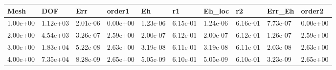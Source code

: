 \begin{tabular}{llllllllll}
Mesh & DOF & Err & order1 & Eh & r1 & Eh_loc & r2 & Err_Eh & order2 \\ 
\hline 
1.00e+00 & 1.12e+03 & 2.01e-06 & 0.00e+00 & 1.23e-06 & 6.15e-01 & 1.24e-06 & 6.16e-01 & 7.73e-07 & 0.00e+00 \\ 
2.00e+00 & 4.54e+03 & 3.26e-07 & 2.59e+00 & 2.00e-07 & 6.12e-01 & 2.00e-07 & 6.12e-01 & 1.26e-07 & 2.59e+00 \\ 
3.00e+00 & 1.83e+04 & 5.22e-08 & 2.63e+00 & 3.19e-08 & 6.11e-01 & 3.19e-08 & 6.11e-01 & 2.03e-08 & 2.63e+00 \\ 
4.00e+00 & 7.35e+04 & 8.28e-09 & 2.65e+00 & 5.05e-09 & 6.10e-01 & 5.05e-09 & 6.10e-01 & 3.23e-09 & 2.65e+00 \\ 
\hline 
\end{tabular}